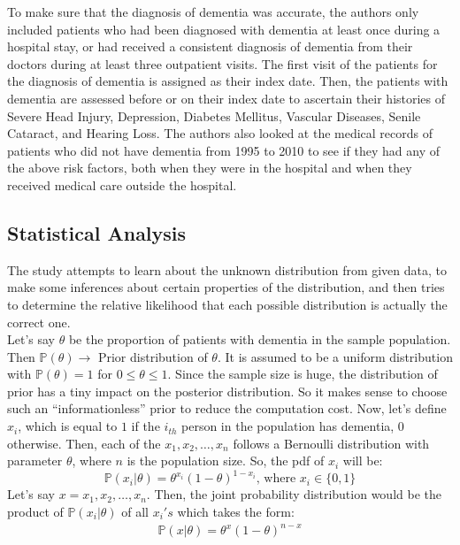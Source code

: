 \documentclass[12pt,letterpaper]{article}
\begin{document}
To make sure that the diagnosis of dementia was accurate, the authors only included patients who had been diagnosed with dementia at least once during a hospital stay, or had received a consistent diagnosis of dementia from their doctors during at least three outpatient visits. The first visit of the patients for the diagnosis of dementia is assigned as their index date. Then, the patients with dementia are assessed before or on their index date to ascertain their histories of Severe Head Injury, Depression, Diabetes Mellitus, Vascular Diseases, Senile Cataract, and Hearing Loss. The authors also looked at the medical records of patients who did not have dementia from 1995 to 2010 to see if they had any of the above risk factors, both when they were in the hospital and when they received medical care outside the hospital.

\subsection{Statistical Analysis}
The study attempts to learn about the unknown distribution from given data, to make some inferences about certain properties of the distribution, and then tries to determine the relative likelihood that each possible distribution is actually the correct one. \\

Let's say $\theta$ be the proportion of patients with dementia in the sample population. Then $ \mathbb{P}(\theta) \rightarrow$ Prior distribution of $\theta$. It is assumed to be a uniform distribution with $\mathbb{P}(\theta) = 1$ for $0 \le \theta \le 1$. Since the sample size is huge, the distribution of prior has a tiny impact on the posterior distribution. So it makes sense to choose such an ``informationless'' prior to reduce the computation cost. Now, let's define $x_i$, which is equal to $1$ if the $i_{th}$ person in the population has dementia, $0$ otherwise. Then, each of the $x_1, x_2, \dots, x_n$ follows a Bernoulli distribution with parameter $\theta$, where $n$ is the population size. So, the pdf of $x_i$ will be:
$$ \mathbb{P}(x_i | \theta) = \theta^{x_i}(1 - \theta)^{1-x_i} \text{, where } x_i \in \{0,1\}$$
Let's say $x = x_1, x_2, \dots, x_n$. Then, the joint probability distribution would be the product of $ \mathbb{P}(x_i | \theta)$ of all $x_i's$ which takes the form:
\begin{align*}
\mathbb{P}(x | \theta) = \theta^x(1-\theta)^{n - x} \tag*{} \\
\end{align*}
\end{document}
